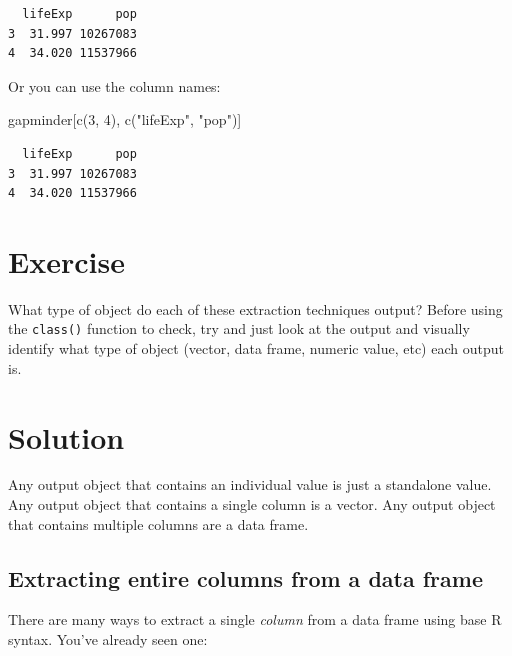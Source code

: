 \documentclass[
  letterpaper,
  DIV=11,
  numbers=noendperiod]{scrreprt}
\newenvironment{Shaded}{\begin{snugshade}}{\end{snugshade}}
\newcommand{\DecValTok}[1]{\textcolor[rgb]{0.68,0.00,0.00}{#1}}
\newcommand{\FunctionTok}[1]{\textcolor[rgb]{0.28,0.35,0.67}{#1}}
\newcommand{\NormalTok}[1]{\textcolor[rgb]{0.00,0.23,0.31}{#1}}
\newcommand{\SpecialCharTok}[1]{\textcolor[rgb]{0.37,0.37,0.37}{#1}}
\newcommand{\StringTok}[1]{\textcolor[rgb]{0.13,0.47,0.30}{#1}}
\begin{document}
\begin{verbatim}
  lifeExp      pop
3  31.997 10267083
4  34.020 11537966
\end{verbatim}

Or you can use the column names:

\begin{Shaded}
\begin{Highlighting}[]
\NormalTok{gapminder[}\FunctionTok{c}\NormalTok{(}\DecValTok{3}\NormalTok{, }\DecValTok{4}\NormalTok{), }\FunctionTok{c}\NormalTok{(}\StringTok{"lifeExp"}\NormalTok{, }\StringTok{"pop"}\NormalTok{)]}
\end{Highlighting}
\end{Shaded}

\begin{verbatim}
  lifeExp      pop
3  31.997 10267083
4  34.020 11537966
\end{verbatim}

\section{Exercise}

What type of object do each of these extraction techniques output?
Before using the \texttt{class()} function to check, try and just look
at the output and visually identify what type of object (vector, data
frame, numeric value, etc) each output is.

\section{Solution}

Any output object that contains an individual value is just a standalone
value. Any output object that contains a single column is a vector. Any
output object that contains multiple columns are a data frame.

\subsection{Extracting entire columns from a data
frame}\label{extracting-entire-columns-from-a-data-frame}

There are many ways to extract a single \emph{column} from a data frame
using base R syntax. You've already seen one:

\begin{Shaded}
\end{Shaded}
\end{document}
